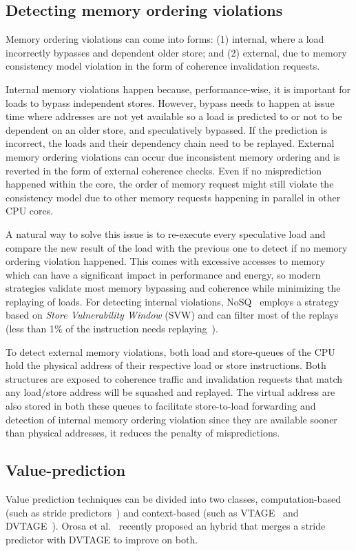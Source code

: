 \documentclass{sig-alternate}
\begin{document}
\subsection{Detecting memory ordering violations}
Memory ordering violations can come into forms: (1) internal, where a load incorrectly bypasses and dependent older store; and (2) external, due to memory consistency model violation in the form of coherence invalidation requests.

Internal memory violations happen because, performance-wise, it is important for loads to bypass independent stores. However, bypass needs to happen at issue time where addresses are not yet available so a load is predicted to or not to be dependent on an older store, and speculatively bypassed. If the prediction is incorrect, the loads and their dependency chain need to be replayed. External memory ordering violations can occur due inconsistent  memory ordering and is reverted in the form of external coherence checks. Even if no misprediction happened within the core, the order of memory request might still violate the consistency model due to other memory requests happening in parallel in other CPU cores.

A natural way to solve this issue is to re-execute every speculative load and compare the new result of the load with the previous one to detect if no memory ordering violation happened. This comes with excessive accesses to memory which can have a significant impact in performance and energy, so modern strategies validate most memory bypassing and coherence while minimizing the replaying of loads. For detecting internal violations, NoSQ~\cite{} employs a strategy based on \textit{Store Vulnerability Window} (SVW) and can filter most of the replays (less than 1\% of the instruction needs replaying~\cite{}).

To detect external memory violations, both load and store-queues of the CPU hold the physical address of their respective load or store instructions. Both structures are exposed to coherence traffic and invalidation requests that match any load/store address will be squashed and replayed. The virtual address are also stored in both these queues to facilitate store-to-load forwarding and detection of internal memory ordering violation since they are available sooner than physical addresses, it reduces the penalty of mispredictions.     

\subsection{Value-prediction}
Value prediction techniques can be divided into two classes, computation-based (such as stride predictors~\cite{}) and context-based (such as VTAGE~\cite{} and DVTAGE~\cite{}).  Orosa et al.~\cite{} recently proposed an hybrid that  merges a stride predictor with DVTAGE to improve on both.   
\end{document}
